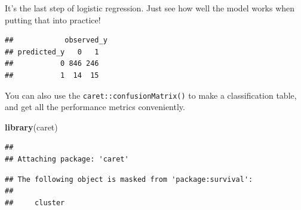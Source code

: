 \documentclass[
]{ctexart}
\newenvironment{Shaded}{\begin{snugshade}}{\end{snugshade}}
\newcommand{\AttributeTok}[1]{\textcolor[rgb]{0.13,0.29,0.53}{#1}}
\newcommand{\DecValTok}[1]{\textcolor[rgb]{0.00,0.00,0.81}{#1}}
\newcommand{\FunctionTok}[1]{\textcolor[rgb]{0.13,0.29,0.53}{\textbf{#1}}}
\newcommand{\NormalTok}[1]{#1}
\newcommand{\OtherTok}[1]{\textcolor[rgb]{0.56,0.35,0.01}{#1}}
\newcommand{\SpecialCharTok}[1]{\textcolor[rgb]{0.81,0.36,0.00}{\textbf{#1}}}
\newcommand{\StringTok}[1]{\textcolor[rgb]{0.31,0.60,0.02}{#1}}
\begin{document}
It's the last step of logistic regression. Just see how well the model
works when putting that into practice!

\begin{Shaded}
\end{Shaded}

\begin{verbatim}
##            observed_y
## predicted_y   0   1
##           0 846 246
##           1  14  15
\end{verbatim}

You can also use the \texttt{caret::confusionMatrix()} to make a
classification table, and get all the performance metrics conveniently.

\begin{Shaded}
\begin{Highlighting}[]
\FunctionTok{library}\NormalTok{(caret)}
\end{Highlighting}
\end{Shaded}

\begin{verbatim}
## 
## Attaching package: 'caret'
\end{verbatim}

\begin{verbatim}
## The following object is masked from 'package:survival':
## 
##     cluster
\end{verbatim}

\begin{Shaded}
\end{Shaded}
\end{document}

